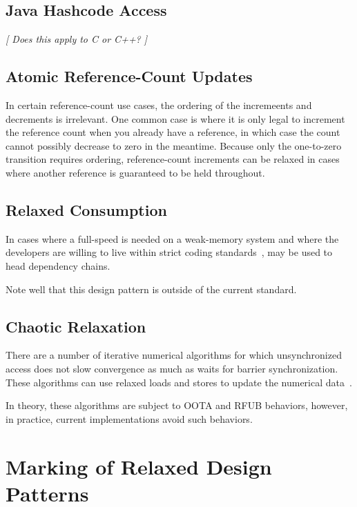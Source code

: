 \documentclass{article}
\begin{document}
\subsection{Java Hashcode Access}
\label{sec:Java Hashcode Access}

\emph{[ Does this apply to C or C++? ]}

\subsection{Atomic Reference-Count Updates}
\label{sec:Atomic Reference-Count Updates}

In certain reference-count use cases, the ordering of the incremeents and
decrements is irrelevant.
One common case is where it is only legal to increment the reference
count when you already have a reference, in which case the count cannot
possibly decrease to zero in the meantime.
Because only the one-to-zero transition requires ordering, reference-count
increments can be relaxed in cases where another reference is guaranteed
to be held throughout.

\subsection{Relaxed Consumption}
\label{sec:Relaxed Consumption}

In cases where a full-speed  is needed on a
weak-memory system and where the developers are willing to live within
strict coding standards~\cite{PaulEMcKenney2014rcu-dereference},
 may be used to head dependency chains.

Note well that this design pattern is outside of the current standard.

\subsection{Chaotic Relaxation}
\label{sec:Chaotic Relaxation}

There are a number of iterative numerical algorithms for which unsynchronized
access does not slow convergence as much as waits for barrier synchronization.
These algorithms can use relaxed loads and stores to update the numerical
data~\cite{Andrews91textbook}.

In theory, these algorithms are subject to OOTA and RFUB behaviors, however,
in practice, current implementations avoid such behaviors.

\section{Marking of Relaxed Design Patterns}
\label{sec:Marking of Relaxed Design Patterns}
\end{document}
